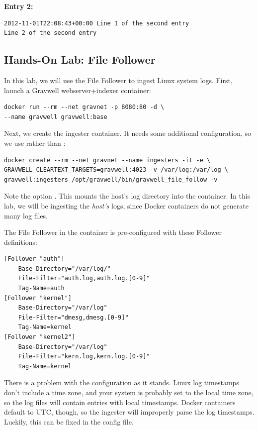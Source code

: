 \textbf{Entry 2:}

\begin{Verbatim}[breaklines=true]
2012-11-01T22:08:43+00:00 Line 1 of the second entry
Line 2 of the second entry
\end{Verbatim}

\subsection{Hands-On Lab: File Follower}

In this lab, we will use the File Follower to ingest Linux system logs.
First, launch a Gravwell webserver+indexer container:

\begin{Verbatim}[breaklines=true]
docker run --rm --net gravnet -p 8080:80 -d \
--name gravwell gravwell:base
\end{Verbatim}

Next, we create the ingester container. It needs some additional
configuration, so we use \code{docker create} rather than :

\begin{Verbatim}[breaklines=true]
docker create --rm --net gravnet --name ingesters -it -e \
GRAVWELL_CLEARTEXT_TARGETS=gravwell:4023 -v /var/log:/var/log \
gravwell:ingesters /opt/gravwell/bin/gravwell_file_follow -v
\end{Verbatim}

Note the option \code{-v /var/log:/var/log}. This mounts the host's
log directory into the container. In this lab, we will be ingesting the
\emph{host's} logs, since Docker containers do not generate many log
files.

The File Follower in the container is pre-configured with these
Follower definitions:

\begin{Verbatim}[breaklines=true]
[Follower "auth"]
    Base-Directory="/var/log/"
    File-Filter="auth.log,auth.log.[0-9]"
    Tag-Name=auth
[Follower "kernel"]
    Base-Directory="/var/log"
    File-Filter="dmesg,dmesg.[0-9]"
    Tag-Name=kernel
[Follower "kernel2"]
    Base-Directory="/var/log"
    File-Filter="kern.log,kern.log.[0-9]"
    Tag-Name=kernel
\end{Verbatim}

There is a problem with the configuration as it stands. Linux log
timestamps don't include a time zone, and your system is probably set to
the local time zone, so the log files will contain entries with local
timestamps. Docker containers default to UTC, though, so the ingester
will improperly parse the log timestamps. Luckily, this can be fixed in
the config file. 

